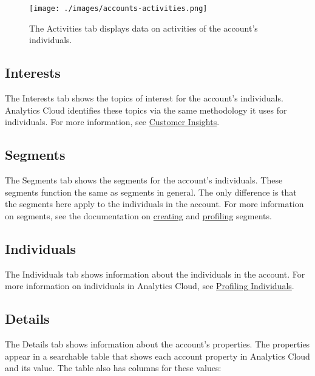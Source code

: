 \begin{figure}
\centering
\texttt{[image: ./images/accounts-activities.png]}
\caption{The Activities tab displays data on activities of the account's
individuals.}
\end{figure}

\subsection{Interests}\label{interests-3}

The Interests tab shows the topics of interest for the account's
individuals. Analytics Cloud identifies these topics via the same
methodology it uses for individuals. For more information, see
\href{https://help.liferay.com/hc/en-us/articles/360006947951-Customer-Insights}{Customer
Insights}.

\subsection{Segments}\label{segments-1}

The Segments tab shows the segments for the account's individuals. These
segments function the same as segments in general. The only difference
is that the segments here apply to the individuals in the account. For
more information on segments, see the documentation on
\href{https://help.liferay.com/hc/en-us/articles/360006947671-Creating-Segments}{creating}
and
\href{https://help.liferay.com/hc/en-us/articles/360006947851-Profiling-Segments}{profiling}
segments.

\subsection{Individuals}\label{individuals}

The Individuals tab shows information about the individuals in the
account. For more information on individuals in Analytics Cloud, see
\href{https://help.liferay.com/hc/en-us/articles/360006946171-Profiling-Individuals}{Profiling
Individuals}.

\subsection{Details}\label{details-1}

The Details tab shows information about the account's properties. The
properties appear in a searchable table that shows each account property
in Analytics Cloud and its value. The table also has columns for these
values:

